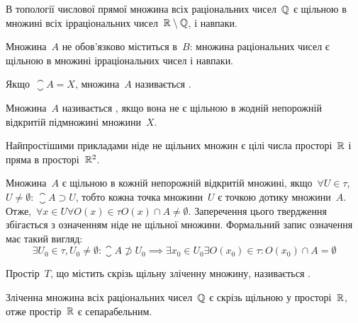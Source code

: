 \begin{example}
    В топології числової прямої множина всіх раціональних чисел~$\mathbb{Q}$ є щільною в множині всіх ірраціональних чисел~$\mathbb{R} \setminus \mathbb{Q}$, і навпаки.
\end{example}

\begin{remark}
    Множина~$A$ не обов'язково міститься в~$B$: множина раціональних чисел є щільною в множині ірраціональних чисел і навпаки.
\end{remark}

\begin{definition}
    Якщо~$\closure A = X$, множина~$A$ називається .
\end{definition}

\begin{definition}
    Множина~$A$ називається , якщо вона не є щільною в жодній непорожній відкритій підмножині множини~$X$.
\end{definition}

\begin{example}
    Найпростішими прикладами ніде не щільних множин є цілі числа просторі~$\mathbb{R}$ і пряма в просторі~$\mathbb{R}^2$.
\end{example}

Множина~$A$ є щільною в кожній непорожній відкритій множині, якщо~$\forall U \in \tau$,~$U \ne \emptyset$: $\closure A \supset U$, тобто кожна точка множини~$U$ є точкою дотику множини~$A$. Отже,~$\forall x \in U \forall O(x) \in \tau O(x) \cap A \ne \emptyset$. Заперечення цього твердження збігається з означенням ніде не щільної множини. Формальний запис означення має такий вигляд:
\begin{equation*}
    \exists U_0 \in \tau, U_0 \ne \emptyset: \closure A \not\supset U_0 \implies \exists x_0 \in U_0 \exists O(x_0) \in \tau: O(x_0) \cap A = \emptyset
\end{equation*}

\begin{definition}
    Простір~$T$, що містить скрізь щільну зліченну множину, називається .
\end{definition}

\begin{example}
    Зліченна множина всіх раціональних чисел~$\mathbb{Q}$ є скрізь щільною у просторі~$\mathbb{R}$, отже простір~$\mathbb{R}$ є сепарабельним.
\end{example}

